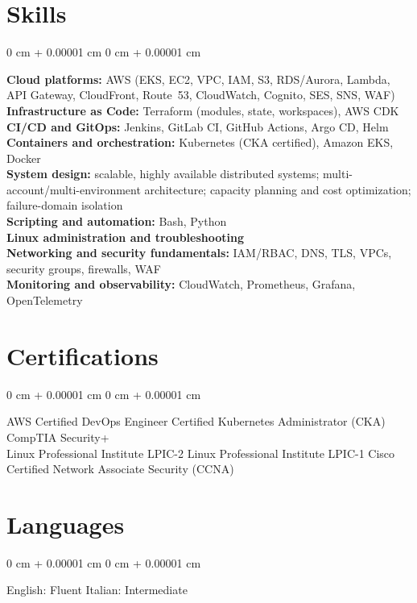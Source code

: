 \documentclass[10pt, letterpaper]{article}
\newenvironment{onecolentry}{
    \begin{adjustwidth}{
        0 cm + 0.00001 cm
    }{
        0 cm + 0.00001 cm
    }
}{
    \end{adjustwidth}
} %
\begin{document}
            \section{Skills}
                \begin{onecolentry}
                    \textbf{Cloud platforms:} AWS (EKS, EC2, VPC, IAM, S3, RDS/Aurora, Lambda, API Gateway, CloudFront, Route~53, CloudWatch, Cognito, SES, SNS, WAF) \\
                    \textbf{Infrastructure as Code:} Terraform (modules, state, workspaces), AWS CDK \\
                    \textbf{CI/CD and GitOps:} Jenkins, GitLab CI, GitHub Actions, Argo CD, Helm \\
                    \textbf{Containers and orchestration:} Kubernetes (CKA certified), Amazon EKS, Docker \\
                    \textbf{System design:} scalable, highly available distributed systems; multi-account/multi-environment architecture; capacity planning and cost optimization; failure-domain isolation \\
                    \textbf{Scripting and automation:} Bash, Python \\
                    \textbf{Linux administration and troubleshooting} \\
                    \textbf{Networking and security fundamentals:} IAM/RBAC, DNS, TLS, VPCs, security groups, firewalls, WAF \\
                    \textbf{Monitoring and observability:} CloudWatch, Prometheus, Grafana, OpenTelemetry
                \end{onecolentry}

            \section{Certifications}
                \begin{onecolentry}
                    AWS Certified DevOps Engineer \;\;\; \textbullet\; Certified Kubernetes Administrator (CKA) \;\;\; \textbullet\; CompTIA Security+ \\
                    Linux Professional Institute LPIC-2 \;\;\; \textbullet\; Linux Professional Institute LPIC-1 \;\;\; \textbullet\; Cisco Certified Network Associate Security (CCNA)
                \end{onecolentry}

            \section{Languages}
                \begin{onecolentry}
                    English: Fluent \;\;\; \textbullet\; Italian: Intermediate
                \end{onecolentry}

        
\end{document}
